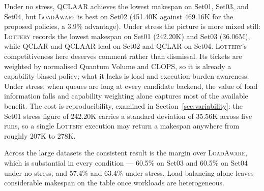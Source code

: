 \documentclass[preprint,12pt]{elsarticle}
\newcommand{\QCLAR}{\textsc{QCLAR}}
\newcommand{\QCLAAR}{\textsc{QCLAAR}}
\newcommand{\LoadAware}{\textsc{LoadAware}}
\newcommand{\Lottery}{\textsc{Lottery}}
\begin{document}
Under no stress, \QCLAAR{} achieves the lowest makespan on Set01, Set03, and
Set04, but \LoadAware{} is best on Set02 (451.40K against 469.16K for the
proposed policies, a 3.9\% advantage). Under stress the picture is more mixed
still: \Lottery{} records the lowest makespan on Set01 (242.20K) and Set03
(36.06M), while \QCLAR{} and \QCLAAR{} lead on Set02 and \QCLAR{} on Set04.
\Lottery{}'s competitiveness here deserves comment rather than dismissal. Its
tickets are weighted by normalised Quantum Volume and CLOPS, so it is already a
capability-biased policy; what it lacks is load and execution-burden awareness.
Under stress, when queues are long at every candidate backend, the value of
load information falls and capability weighting alone captures most of the
available benefit. The cost is reproducibility, examined in
Section~\ref{sec:variability}: the Set01 stress figure of 242.20K carries a
standard deviation of 35.56K across five runs, so a single \Lottery{} execution
may return a makespan anywhere from roughly 207K to 278K.

Across the large datasets the consistent result is the margin over
\LoadAware{}, which is substantial in every condition --- 60.5\% on Set03 and
60.5\% on Set04 under no stress, and 57.4\% and 63.4\% under stress. Load
balancing alone leaves considerable makespan on the table once workloads are
heterogeneous.
\end{document}
